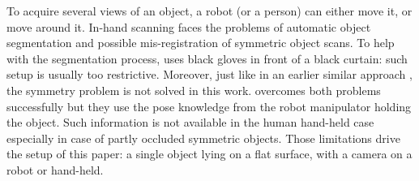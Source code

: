 \documentclass[letterpaper, 10 pt, conference]{ieeeconf}  %
\begin{document}
To acquire several views of an object, a robot (or a person) can either move it, or move around it. In-hand scanning faces the problems
of automatic object segmentation and possible mis-registration of symmetric object scans. To help with the segmentation 
process,
\cite{weise2011online} uses black gloves in front of a black curtain: such setup is usually too restrictive.
Moreover, just like in an earlier similar approach \cite{rusinkiewicz2002real}, the symmetry problem is not solved in this work.
\cite{krainin2011manipulator} overcomes both problems successfully but
they use the pose knowledge from the robot manipulator holding the object.
Such information is not available in the human hand-held case 
especially in case of partly occluded symmetric objects.
Those limitations drive the setup of this paper: a single object lying on a flat surface,
with a camera on a robot or hand-held.
\end{document}
